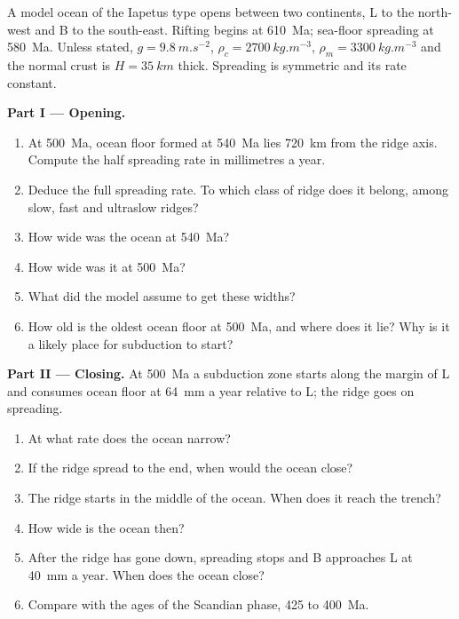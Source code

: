 \begin{problem}\label{pb:b2:wilson-cycle:1}
A model ocean of the Iapetus type opens between two continents, L to the north-west and B to
the south-east. Rifting begins at \qty{610}{Ma}; sea-floor spreading at \qty{580}{Ma}.
Unless stated, $g = \qty{9.8}{m.s^{-2}}$, $\rho_c = \qty{2700}{kg.m^{-3}}$, $\rho_m =
\qty{3300}{kg.m^{-3}}$ and the normal crust is $H = \qty{35}{km}$ thick. Spreading is
symmetric and its rate constant.

\medskip
\noindent\textbf{Part I --- Opening.}
\begin{enumerate}
\item At \qty{500}{Ma}, ocean floor formed at \qty{540}{Ma} lies \qty{720}{km} from the ridge
axis. Compute the half spreading rate in millimetres a year.
\item Deduce the full spreading rate. To which class of ridge does it belong, among slow,
fast and ultraslow ridges?
\item How wide was the ocean at \qty{540}{Ma}?
\item How wide was it at \qty{500}{Ma}?
\item What did the model assume to get these widths?
\item How old is the oldest ocean floor at \qty{500}{Ma}, and where does it lie? Why is it a
likely place for subduction to start?
\end{enumerate}

\noindent\textbf{Part II --- Closing.} At \qty{500}{Ma} a subduction zone starts along the
margin of L and consumes ocean floor at \qty{64}{mm} a year relative to L; the ridge goes on
spreading.
\begin{enumerate}[resume]
\item At what rate does the ocean narrow?
\item If the ridge spread to the end, when would the ocean close?
\item The ridge starts in the middle of the ocean. When does it reach the trench?
\item How wide is the ocean then?
\item After the ridge has gone down, spreading stops and B approaches L at \qty{40}{mm} a
year. When does the ocean close?
\item Compare with the ages of the Scandian phase, 425 to \qty{400}{Ma}.
\end{enumerate}


\end{problem}

